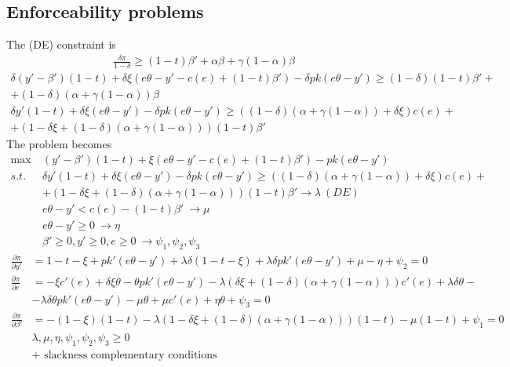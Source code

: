 \documentclass[a4paper]{article}
\begin{document}
\subsection{Enforceability problems}
The (DE) constraint is
\begin{align*}
\frac{\delta \pi}{1 - \delta} \ge (1 - t)\beta' + \alpha \beta + \gamma(1 - \alpha) \beta
\end{align*}
\begin{align*}
\delta (y'-\beta')(1-t) +\delta \xi(e \theta -y' - c(e) + (1-t)\beta')-\delta pk(e \theta - y') \ge (1 - \delta)(1 - t)\beta' +\\
+ (1-\delta)(\alpha + \gamma(1 - \alpha))\beta\\
\delta y'(1-t) +\delta \xi(e \theta -y')-\delta pk(e \theta - y') \ge ((1-\delta)(\alpha + \gamma(1 - \alpha)) +\delta \xi)c(e) +\\ +(1 - \delta \xi + (1 - \delta)(\alpha + \gamma(1 - \alpha)))(1-t)\beta'
\end{align*}
The problem becomes
\begin{align*}
\max\ &(y'-\beta')(1-t) +\xi(e \theta -y' - c(e) + (1-t)\beta')-pk(e \theta - y')\\
s.t.\ &\delta y'(1-t) +\delta \xi(e \theta -y')-\delta pk(e \theta - y') \ge ((1-\delta)(\alpha + \gamma(1 - \alpha)) +\delta \xi)c(e) +\\&+(1 - \delta \xi + (1 - \delta)(\alpha + \gamma(1 - \alpha)))(1-t)\beta'\to \lambda \ (DE)\\
& e \theta - y' < c(e) - (1-t)\beta'\ \to \mu \\
& e\theta - y' \ge 0\ \to \eta\\
& \beta' \ge 0, y' \ge 0, e \ge 0\ \to \psi_1, \psi_2,\psi_3
\end{align*}
\begin{align}
\frac{\partial \pi}{\partial y'} &= 1-t-\xi + pk'(e \theta - y') + \lambda \delta (1 - t - \xi) + \lambda \delta pk'(e \theta - y') + \mu - \eta + \psi_2 = 0 \label{eq8}\\
\frac{\partial \pi}{\partial e} &= -\xi c'(e)+\delta \xi \theta - \theta pk'(e\theta - y')- \lambda (\delta\xi + (1-\delta)(\alpha + \gamma(1 - \alpha))) c'(e) + \lambda \delta \theta - \nonumber\\ 
&-\lambda \delta \theta pk'(e \theta - y') - \mu \theta + \mu c'(e) + \eta \theta+ \psi_3 = 0\label{eq9}\\
\frac{\partial \pi}{\partial \beta'} &= -(1-\xi)(1-t) - \lambda(1 - \delta \xi + (1 - \delta)(\alpha + \gamma(1 - \alpha)))(1-t) - \mu(1-t) + \psi_1 = 0\label{eq10}\\
& \lambda, \mu, \eta, \psi_1, \psi_2, \psi_3 \ge 0 \label{eq11}\\
&+\text{ slackness complementary conditions}\nonumber
\end{align}
\end{document}
